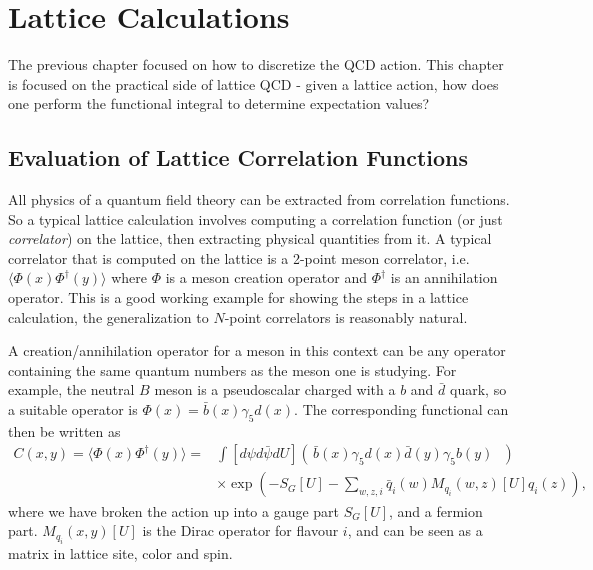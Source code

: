 ﻿\chapter{Lattice Calculations}
\label{chap:latticecalculations}

The previous chapter focused on how to discretize the QCD action. This chapter is focused on the practical side of lattice QCD - given a lattice action, how does one perform the functional integral to determine expectation values?

\section{Evaluation of Lattice Correlation Functions}
\label{sec:latpathint}

All physics of a quantum field theory can be extracted from correlation functions. So a typical lattice calculation involves computing a correlation function (or just {\it{correlator}}) on the lattice, then extracting physical quantities from it. A typical correlator that is computed on the lattice is a 2-point meson correlator, i.e. $\langle\Phi(x)\Phi^{\dagger}(y)\rangle$ where $\Phi$ is a meson creation operator and $\Phi^{\dagger}$ is an annihilation operator. This is a good working example for showing the steps in a lattice calculation, the generalization to $N$-point correlators is reasonably natural.

A creation/annihilation operator for a meson in this context can be any operator containing the same quantum numbers as the meson one is studying. For example, the neutral $B$ meson is a pseudoscalar charged with a $b$ and $\bar{d}$ quark, so a suitable operator is $\Phi(x) = \bar{b}(x)\gamma_5 d(x)$. The corresponding functional can then be written as
\begin{align}
  \nonumber
  C(x,y) = \langle \Phi(x)\Phi^{\dagger}(y)\rangle =& \int [d\psi d\bar{\psi} dU] \left(\, \bar{b}(x)\gamma_5 d(x) \bar{d}(y)\gamma_5 b(y) \text{ }\right) \\&\times \exp\left(-S_G[U]-\sum_{w,z,i} \bar{q}_i(w)M_{q_i}(w,z)[U]q_i(z)\right),
\end{align}
where we have broken the action up into a gauge part $S_G[U]$, and a fermion part. $M_{q_i}(x,y)[U]$ is the Dirac operator for flavour $i$, and can be seen as a matrix in lattice site, color and spin.

